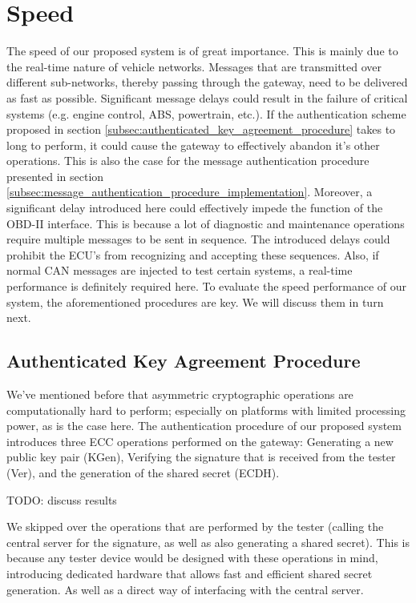 \section{Speed}
\label{sec:speed}

The speed of our proposed system is of great importance. This is mainly due to the real-time nature of vehicle networks. Messages that are transmitted over different sub-networks, thereby passing through the gateway, need to be delivered as fast as possible. Significant message delays could result in the failure of critical systems (e.g. engine control, ABS, powertrain, etc.). If the authentication scheme proposed in section \ref{subsec:authenticated_key_agreement_procedure} takes to long to perform, it could cause the gateway to effectively abandon it's other operations. This is also the case for the message authentication procedure presented in section \ref{subsec:message_authentication_procedure_implementation}. Moreover, a significant delay introduced here could effectively impede the function of the OBD-II interface. This is because a lot of diagnostic and maintenance operations require multiple messages to be sent in sequence. The introduced delays could prohibit the ECU's from recognizing and accepting these sequences. Also, if normal CAN messages are injected to test certain systems, a real-time performance is definitely required here. To evaluate the speed performance of our system, the aforementioned procedures are key. We will discuss them in turn next.

\subsection{Authenticated Key Agreement Procedure}
\label{subsec:speed1}

We've mentioned before that asymmetric cryptographic operations are computationally hard to perform; especially on platforms with limited processing power, as is the case here. The authentication procedure of our proposed system introduces three ECC operations performed on the gateway: Generating a new public key pair (KGen), Verifying the signature that is received from the tester (Ver), and the generation of the shared secret (ECDH).

TODO: discuss results

We skipped over the operations that are performed by the tester (calling the central server for the signature, as well as also generating a shared secret). This is because any tester device would be designed with these operations in mind, introducing dedicated hardware that allows fast and efficient shared secret generation. As well as a direct way of interfacing with the central server. 

